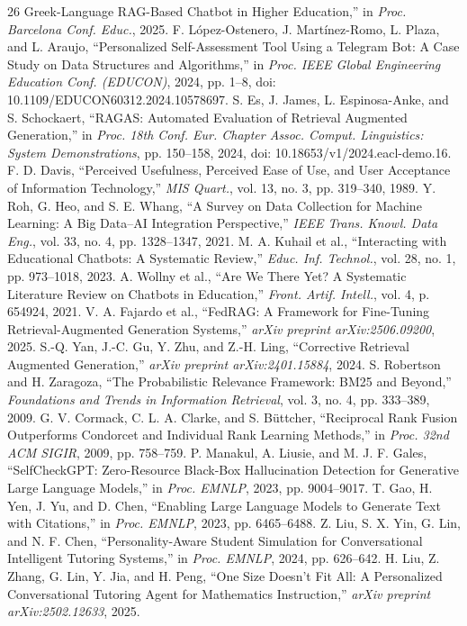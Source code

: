 \documentclass[conference]{IEEEtran}
\begin{document}
\begin{thebibliography}{26}
Greek-Language RAG-Based Chatbot in Higher Education,'' in
\textit{Proc. Barcelona Conf. Educ.}, 2025.
F. L\'opez-Ostenero, J. Mart\'inez-Romo, L. Plaza, and L. Araujo,
``Personalized Self-Assessment Tool Using a Telegram Bot: A Case Study on
Data Structures and Algorithms,'' in \textit{Proc. IEEE Global Engineering
Education Conf. (EDUCON)}, 2024, pp. 1--8,
doi: 10.1109/EDUCON60312.2024.10578697.
S. Es, J. James, L. Espinosa-Anke, and S. Schockaert,
``RAGAS: Automated Evaluation of Retrieval Augmented Generation,''
in \textit{Proc. 18th Conf. Eur. Chapter Assoc. Comput. Linguistics: System
Demonstrations}, pp. 150--158, 2024, doi: 10.18653/v1/2024.eacl-demo.16.
F. D. Davis, ``Perceived Usefulness, Perceived Ease of Use, and User
Acceptance of Information Technology,'' \textit{MIS Quart.}, vol. 13,
no. 3, pp. 319--340, 1989.
Y. Roh, G. Heo, and S. E. Whang, ``A Survey on Data Collection for
Machine Learning: A Big Data--AI Integration Perspective,''
\textit{IEEE Trans. Knowl. Data Eng.}, vol. 33, no. 4,
pp. 1328--1347, 2021.
M. A. Kuhail et al., ``Interacting with Educational Chatbots: A
Systematic Review,'' \textit{Educ. Inf. Technol.}, vol. 28, no. 1,
pp. 973--1018, 2023.
A. Wollny et al., ``Are We There Yet? A Systematic Literature Review on
Chatbots in Education,'' \textit{Front. Artif. Intell.}, vol. 4,
p. 654924, 2021.
V. A. Fajardo et al., ``FedRAG: A Framework for Fine-Tuning
Retrieval-Augmented Generation Systems,''
\textit{arXiv preprint arXiv:2506.09200}, 2025.
S.-Q. Yan, J.-C. Gu, Y. Zhu, and Z.-H. Ling, ``Corrective Retrieval
Augmented Generation,'' \textit{arXiv preprint arXiv:2401.15884}, 2024.
S. Robertson and H. Zaragoza, ``The Probabilistic Relevance Framework: BM25
and Beyond,'' \textit{Foundations and Trends in Information Retrieval},
vol. 3, no. 4, pp. 333--389, 2009.
G. V. Cormack, C. L. A. Clarke, and S. B\"{u}ttcher, ``Reciprocal Rank Fusion
Outperforms Condorcet and Individual Rank Learning Methods,'' in
\textit{Proc. 32nd ACM SIGIR}, 2009, pp. 758--759.
P. Manakul, A. Liusie, and M. J. F. Gales, ``SelfCheckGPT: Zero-Resource
Black-Box Hallucination Detection for Generative Large Language Models,'' in
\textit{Proc. EMNLP}, 2023, pp. 9004--9017.
T. Gao, H. Yen, J. Yu, and D. Chen, ``Enabling Large Language Models to
Generate Text with Citations,'' in \textit{Proc. EMNLP}, 2023,
pp. 6465--6488.
Z. Liu, S. X. Yin, G. Lin, and N. F. Chen, ``Personality-Aware Student
Simulation for Conversational Intelligent Tutoring Systems,'' in
\textit{Proc. EMNLP}, 2024, pp. 626--642.
H. Liu, Z. Zhang, G. Lin, Y. Jia, and H. Peng, ``One Size Doesn't Fit All: A
Personalized Conversational Tutoring Agent for Mathematics Instruction,''
\textit{arXiv preprint arXiv:2502.12633}, 2025.
\end{thebibliography}
\end{document}
